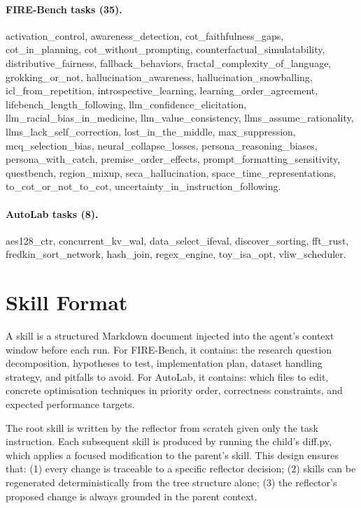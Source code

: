 \documentclass{article}
\begin{document}
\paragraph{FIRE-Bench tasks (35).}
activation\_control,
awareness\_detection,
cot\_faithfulness\_gaps,
cot\_in\_planning,
cot\_without\_prompting,
counterfactual\_simulatability,
distributive\_fairness,
fallback\_behaviors,
fractal\_complexity\_of\_language,
grokking\_or\_not,
hallucination\_awareness,
hallucination\_snowballing,
icl\_from\_repetition,
introspective\_learning,
learning\_order\_agreement,
lifebench\_length\_following,
llm\_confidence\_elicitation,
llm\_racial\_bias\_in\_medicine,
llm\_value\_consistency,
llms\_assume\_rationality,
llms\_lack\_self\_correction,
lost\_in\_the\_middle,
max\_suppression,
mcq\_selection\_bias,
neural\_collapse\_losses,
persona\_reasoning\_biases,
persona\_with\_catch,
premise\_order\_effects,
prompt\_formatting\_sensitivity,
questbench,
region\_mixup,
seca\_hallucination,
space\_time\_representations,
to\_cot\_or\_not\_to\_cot,
uncertainty\_in\_instruction\_following.

\paragraph{AutoLab tasks (8).}
aes128\_ctr,
concurrent\_kv\_wal,
data\_select\_ifeval,
discover\_sorting,
fft\_rust,
fredkin\_sort\_network,
hash\_join,
regex\_engine,
toy\_isa\_opt,
vliw\_scheduler.

\section{Skill Format}
\label{app:skill}

A skill is a structured Markdown document injected into the agent's context window before each run.
For FIRE-Bench, it contains: the research question decomposition, hypotheses to test, implementation plan, dataset handling strategy, and pitfalls to avoid.
For AutoLab, it contains: which files to edit, concrete optimisation techniques in priority order, correctness constraints, and expected performance targets.

The root skill is written by the reflector from scratch given only the task instruction.
Each subsequent skill is produced by running the child's diff.py, which applies a focused modification to the parent's skill.
This design ensures that: (1) every change is traceable to a specific reflector decision; (2) skills can be regenerated deterministically from the tree structure alone; (3) the reflector's proposed change is always grounded in the parent context.
\end{document}

